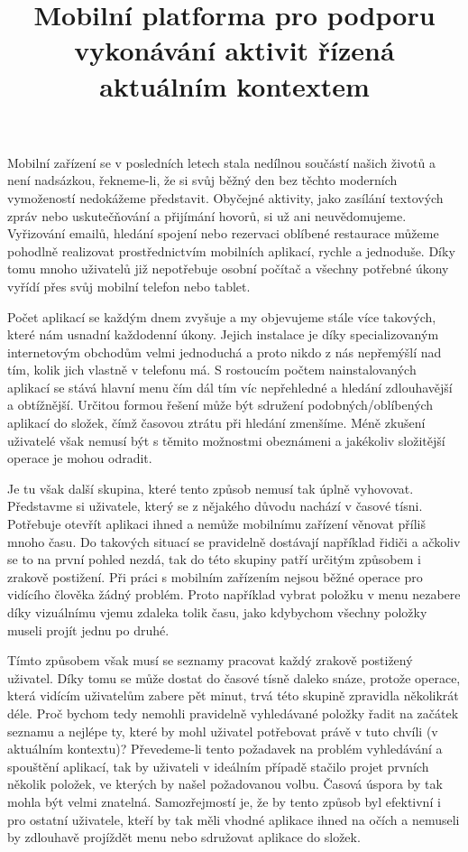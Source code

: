\documentclass[thesis=M,czech]{FITthesis}[2012/06/26]
\title{Mobilní platforma pro podporu vykonávání aktivit řízená aktuálním kontextem}
\begin{document}

\begin{introduction}
Mobilní zařízení se v posledních letech stala nedílnou součástí našich životů a není nadsázkou, řekneme-li, že si svůj běžný den bez těchto moderních vymožeností nedokážeme představit. Obyčejné aktivity, jako zasílání textových zpráv nebo uskutečňování a přijímání hovorů, si už ani neuvědomujeme. Vyřizování emailů, hledání spojení nebo rezervaci oblíbené restaurace můžeme pohodlně realizovat prostřednictvím mobilních aplikací, rychle a jednoduše. Díky tomu mnoho uživatelů již nepotřebuje osobní počítač a všechny potřebné úkony vyřídí přes svůj mobilní telefon nebo tablet.

Počet aplikací se každým dnem zvyšuje a my objevujeme stále více takových, které nám usnadní každodenní úkony. Jejich instalace je díky specializovaným internetovým obchodům velmi jednoduchá a proto nikdo z nás nepřemýšlí nad tím, kolik jich vlastně v telefonu má. S rostoucím počtem nainstalovaných aplikací se stává hlavní menu čím dál tím víc nepřehledné a hledání zdlouhavější a obtížnější. Určitou formou řešení může být sdružení podobných/oblíbených aplikací do složek, čímž časovou ztrátu při hledání zmenšíme. Méně zkušení uživatelé však nemusí být s těmito možnostmi obeznámeni a jakékoliv složitější operace je mohou odradit.

Je tu však další skupina, které tento způsob nemusí tak úplně vyhovovat. Představme si uživatele, který se z nějakého důvodu nachází v časové tísni. Potřebuje otevřít aplikaci ihned a nemůže mobilnímu zařízení věnovat příliš mnoho času. Do takových situací se pravidelně dostávají například řidiči a ačkoliv se to na první pohled nezdá, tak do této skupiny patří určitým způsobem i zrakově postižení. Při práci s mobilním zařízením nejsou běžné operace pro vidícího člověka žádný problém. Proto například vybrat položku v menu nezabere díky vizuálnímu vjemu zdaleka tolik času, jako kdybychom všechny položky museli projít jednu po druhé.

Tímto způsobem však musí se seznamy pracovat každý zrakově postižený uživatel. Díky tomu se může dostat do časové tísně daleko snáze, protože operace, která vidícím uživatelům zabere pět minut, trvá této skupině zpravidla několikrát déle. Proč bychom tedy nemohli pravidelně vyhledávané položky řadit na začátek seznamu a nejlépe ty, které by mohl uživatel potřebovat právě v tuto chvíli (v aktuálním kontextu)? Převedeme-li tento požadavek na problém vyhledávání a spouštění aplikací, tak by uživateli v ideálním případě stačilo projet prvních několik položek, ve kterých by našel požadovanou volbu. Časová úspora by tak mohla být velmi znatelná. Samozřejmostí je, že by tento způsob byl efektivní i pro ostatní uživatele, kteří by tak měli vhodné aplikace ihned na očích a nemuseli by zdlouhavě projíždět menu nebo sdružovat aplikace do složek.


\end{introduction}
\end{document}
